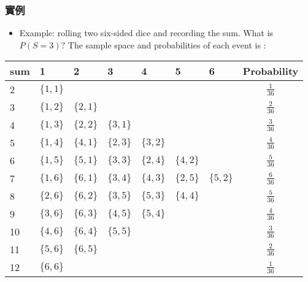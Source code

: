 \documentclass{beamer}
\begin{document}
\begin{frame}\frametitle{實例}
\begin{itemize}
\item Example: rolling two six-sided dice and recording the sum. What is $P(S=3)$? The sample space and probabilities of each event is :\\
\end{itemize}
\begin{table}[ht]
\centering
\footnotesize
\begin{tabular}{|l|l|l|l|l|l|l|c|}
\hline
sum&1&2&3&4&5&6&Probability\\
\hline
2&$\{1,1\}$&&&&&&$\frac{1}{36}$\\
\hline
3&$\{1,2\}$&$\{2,1\}$&&&&&$\frac{2}{36}$\\
\hline
4&$\{1,3\}$&$\{2,2\}$&$\{3,1\}$&&&&$\frac{3}{36}$\\
\hline
5&$\{1,4\}$&$\{4,1\}$&$\{2,3\}$&$\{3,2\}$&&&$\frac{4}{36}$\\
\hline
6&$\{1,5\}$&$\{5,1\}$&$\{3,3\}$&$\{2,4\}$&$\{4,2\}$&&$\frac{5}{36}$\\
\hline
7&$\{1,6\}$&$\{6,1\}$&$\{3,4\}$&$\{4,3\}$&$\{2,5\}$&$\{5,2\}$&$\frac{6}{36}$\\
\hline
8&$\{2,6\}$&$\{6,2\}$&$\{3,5\}$&$\{5,3\}$&$\{4,4\}$&&$\frac{5}{36}$\\
\hline
9&$\{3,6\}$&$\{6,3\}$&$\{4,5\}$&$\{5,4\}$&&&$\frac{4}{36}$\\
\hline
10&$\{4,6\}$&$\{6,4\}$&$\{5,5\}$&&&&$\frac{3}{36}$\\
\hline
11&$\{5,6\}$&$\{6,5\}$&&&&&$\frac{2}{36}$\\
\hline
12&$\{6,6\}$&&&&&&$\frac{1}{36}$\\
\hline
\end{tabular}
\end{table}
\end{frame}
\end{document}
